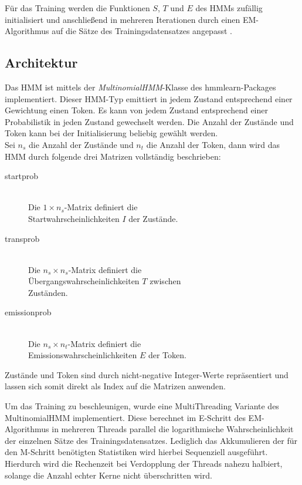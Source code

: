 \documentclass[conference]{IEEEtran}
\begin{document}
Für das Training werden die Funktionen $S$, $T$ und $E$ des HMMs zufällig initialisiert und anschließend in mehreren Iterationen durch einen EM-Algorithmus auf die Sätze des Trainingsdatensatzes angepasst \cite{hmmTraining}.

\subsection{Architektur}
Das HMM ist mittels der \textit{MultinomialHMM}-Klasse des hmmlearn-Packages \cite{hmmlearn} implementiert. 
Dieser HMM-Typ emittiert in jedem Zustand entsprechend einer Gewichtung einen Token.
Es kann von jedem Zustand entsprechend einer Probabilistik in jeden Zustand gewechselt werden.
Die Anzahl der Zustände und Token kann bei der Initialisierung beliebig gewählt werden.\\
Sei $n_s$ die Anzahl der Zustände und $n_t$ die Anzahl der Token, dann wird das HMM durch folgende drei Matrizen vollständig beschrieben:
\begin{description}
\item[startprob]\hfill \\
Die $1\times n_s$-Matrix definiert die \\Startwahrscheinlichkeiten $I$ der Zustände.\\
\item[transprob]\hfill \\
Die $n_s\times n_s$-Matrix definiert die \\Übergangswahrscheinlichkeiten $T$ zwischen \\Zuständen.\\
\item[emissionprob]\hfill \\
Die $n_s\times n_t$-Matrix definiert die \\Emissionswahrscheinlichkeiten $E$ der Token.
\end{description}
Zustände und Token sind durch nicht-negative Integer-Werte repräsentiert und lassen sich somit direkt als Index auf die Matrizen anwenden.

Um das Training zu beschleunigen, wurde eine MultiThreading Variante des MultinomialHMM implementiert.
Diese berechnet im E-Schritt des EM-Algorithmus in mehreren Threads parallel die logarithmische Wahrscheinlichkeit der einzelnen Sätze des Trainingsdatensatzes.
Lediglich das Akkumulieren der für den M-Schritt benötigten Statistiken wird hierbei Sequenziell ausgeführt.
Hierdurch wird die Rechenzeit bei Verdopplung der Threads nahezu halbiert, solange die Anzahl echter Kerne nicht überschritten wird.
\end{document}
